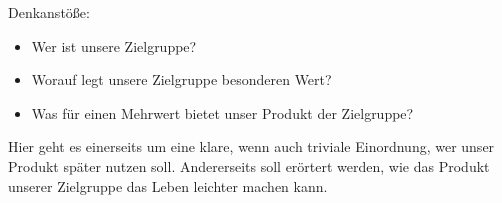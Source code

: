 Denkanstöße:
\begin{itemize}
\item Wer ist unsere Zielgruppe?
\item Worauf legt unsere Zielgruppe besonderen Wert?
\item Was für einen Mehrwert bietet unser Produkt der Zielgruppe?
\end{itemize}
Hier geht es einerseits um eine klare, wenn auch triviale Einordnung, wer unser Produkt später nutzen soll. Andererseits soll erörtert werden, wie das Produkt unserer Zielgruppe das Leben leichter machen kann.
\nsecend

    
    
    


